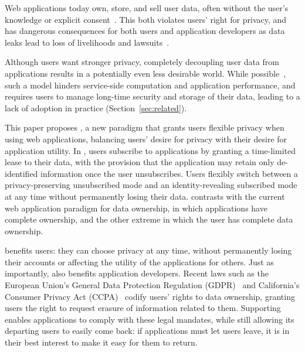 \iffalse
%
%
Web applications today own, store, and sell user data, often without the user's knowledge or
explicit consent~\cite{nytimes:fb, npr:data}. This both violates users' right for privacy, and has
dangerous consequences for both users and application developers as data leaks lead to loss of
livelihoods and lawsuits~\cite{breach:amazon,breach:twitter, breach:fb, breach:marriott,
breach:quora}.

Although users want stronger privacy, completely decoupling user data from applications results in a
potentially even less desirable world. While possible~\cite{solid, amber, w5, blockstack, bstore}, such a
model hinders service-side computation and application performance, and requires users to manage
long-time security and storage of their data, leading to a lack of adoption in practice (Section~\ref{sec:related}).

This paper proposes \name, a new paradigm that grants users flexible privacy when using web
applications, balancing users' desire for privacy with their desire for application utility. In
\name, users subscribe to applications by granting a time-limited lease to their data, with the
provision that the application may retain only de-identified information once the user unsubscribes.
Users flexibly switch between a privacy-preserving unsubscribed mode and an identity-revealing
subscribed mode at any time without permanently losing their data. \name contrasts
with the current web application paradigm for data ownership, in which applications have complete
ownership, and the other extreme in which the user has complete data ownership.%

\name benefits users: they can choose privacy at any time, without
permanently losing their accounts or affecting the utility of the applications for others.  Just as
importantly, \name also benefits application developers. Recent laws such as the
European Union's General Data Protection Regulation (GDPR)~\cite{eu:gdpr} and California's Consumer
Privacy Act (CCPA)~\cite{ca:privacy-act} codify users' rights to data ownership, granting users the
right to request erasure of information related to them. Supporting \name enables
applications to comply with these legal mandates, while still allowing its departing users to easily
come back: if applications must let users leave, it is in their best interest to make it easy for
them to return.

